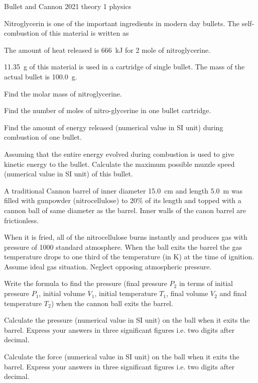 \ylDisplay
{Bullet and Cannon}%
{2021}%
{theory}%
{1}%
{physics}%
{}%
{
\ifStatement
{}
Nitroglycerin is one of the important ingredients in modern day bullets. The self-combustion of this material is written as


The amount of heat released is \SI{666}{\kJ} for 2 mole of nitroglycerine.

\SI{11.35}{\g} of this material is used in a cartridge of single bullet. The mass of the actual bullet is \SI{100.0}{\g}.

\prob
Find the molar mass of nitroglycerine.

\prob
Find the number of moles of nitro-glycerine in one bullet cartridge.

\prob
Find the amount of energy released (numerical value in SI unit) during combustion of one bullet.

\prob
Assuming that the entire energy evolved during combustion is used to give kinetic energy to the bullet. Calculate the maximum possible muzzle speed (numerical value in SI unit) of this bullet.



A traditional Cannon barrel of inner diameter \SI{15.0}{\cm} and length \SI{5.0}{\m} was filled with gunpowder (nitrocellulose) to 20\% of its length and topped with a cannon ball of same diameter as the barrel. Inner walls of the canon barrel are frictionless.

When it is fried, all of the nitrocellulose burns instantly and produces gas with pressure of 1000 standard atmosphere. When the ball exits the barrel the gas temperature drops to one third of the temperature (in K) at the time of ignition. Assume ideal gas situation. Neglect opposing atmospheric pressure.

\prob
Write the formula to find the pressure (final pressure $P_2$ in terms of initial pressure $P_1$, initial volume $V_1$, initial temperature $T_1$, final volume $V_2$ and final temperature $T_2$) when the cannon ball exits the barrel.

\prob
Calculate the pressure (numerical value in SI unit) on the ball when it exits the barrel. Express your answers in three significant figures i.e. two digits after decimal.

\prob
Calculate the force (numerical value in SI unit) on the ball when it exits the barrel. Express your answers in three significant figures i.e. two digits after decimal.


}
